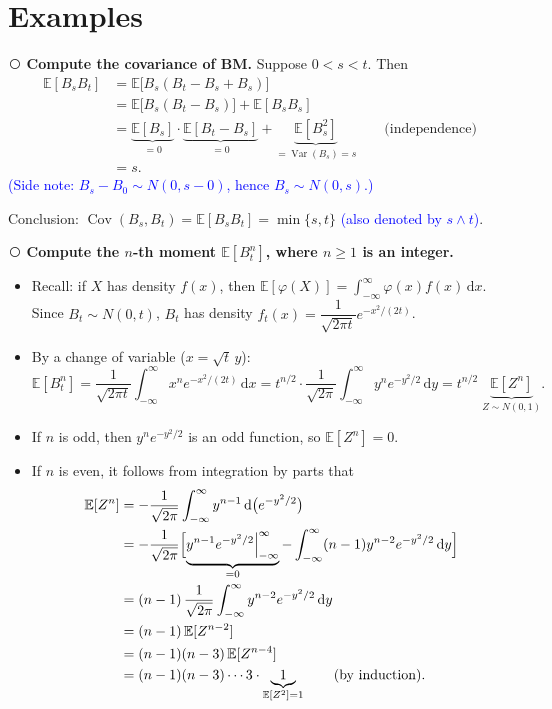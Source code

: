 \documentclass[11pt]{article}
\newcommand{\E}{\mathbb{E}}
\newcommand{\dd}{\,\mathrm{d}}
\newcommand{\cnum}[1]{\textcircled{\raisebox{-0.6pt}{\scriptsize #1}}} %
\newcommand{\Var}{\operatorname{Var}}
\newcommand{\Cov}{\operatorname{Cov}}
\newcommand{\ann}[1]{\textcolor{blue}{#1}}
\theoremstyle{definition}
\begin{document}
\section{Examples}

\noindent\cnum{1} \textbf{Compute the covariance of BM.} Suppose $0<s<t$. Then
\begin{align*}
  \E[B_sB_t]
    &= \E\bigl[B_s(B_t-B_s+B_s)\bigr]\\
    &= \E\bigl[B_s(B_t-B_s)\bigr]+\E[B_sB_s]\\
    &= \underbrace{\E[B_s]}_{=0}\cdot\underbrace{\E[B_t-B_s]}_{=0}+\underbrace{\E[B_s^2]}_{=\Var(B_s)=s}
       \qquad\text{(independence)}\\
    &= s .
\end{align*}
\ann{(Side note: $B_s-B_0\sim N(0,s-0)$, hence $B_s\sim N(0,s)$.)}

\smallskip
\noindent Conclusion: $\Cov(B_s,B_t)=\E[B_sB_t]=\min\{s,t\}$
\ann{(also denoted by $s\wedge t$)}.

\medskip
\noindent\cnum{2} \textbf{Compute the $n$-th moment $\E[B_t^n]$, where $n\ge1$ is an integer.}

\begin{itemize}
\item Recall: if $X$ has density $f(x)$, then
      $\E[\varphi(X)]=\displaystyle\int_{-\infty}^{\infty}\varphi(x)f(x)\dd x$.
      Since $B_t\sim N(0,t)$, $B_t$ has density
      $f_t(x)=\dfrac{1}{\sqrt{2\pi t}}e^{-x^2/(2t)}$.
\item By a change of variable ($x=\sqrt{t}\,y$):
      \[
        \E[B_t^n]=\frac{1}{\sqrt{2\pi t}}\int_{-\infty}^{\infty}x^ne^{-x^2/(2t)}\dd x
        =t^{n/2}\cdot\frac{1}{\sqrt{2\pi}}\int_{-\infty}^{\infty}y^ne^{-y^2/2}\dd y
        =t^{n/2}\;\underbrace{\E[Z^n]}_{Z\sim N(0,1)} .
      \]
\item If $n$ is odd, then $y^ne^{-y^2/2}$ is an odd function, so $\E[Z^n]=0$.
\item If $n$ is even, it follows from integration by parts that
      \begin{align*}
        \E[Z^n]
          &= -\frac{1}{\sqrt{2\pi}}\int_{-\infty}^{\infty}y^{n-1}\dd\bigl(e^{-y^2/2}\bigr)\\
          &= -\frac{1}{\sqrt{2\pi}}
             \Bigl[\underbrace{y^{n-1}e^{-y^2/2}\Big|_{-\infty}^{\infty}}_{=0}
             -\int_{-\infty}^{\infty}(n-1)y^{n-2}e^{-y^2/2}\dd y\Bigr]\\
          &= (n-1)\,\frac{1}{\sqrt{2\pi}}\int_{-\infty}^{\infty}y^{n-2}e^{-y^2/2}\dd y\\
          &= (n-1)\,\E[Z^{n-2}]\\
          &= (n-1)(n-3)\,\E[Z^{n-4}]\\
          &= (n-1)(n-3)\cdots3\cdot\underbrace{1}_{\E[Z^2]=1}
             \qquad\text{(by induction).}
      \end{align*}
\end{itemize}
\end{document}
